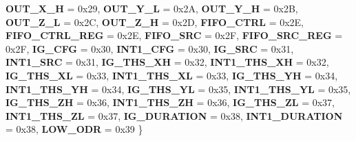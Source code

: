 \begin{DoxyCompactItemize}
{\bfseries O\+U\+T\+\_\+\+X\+\_\+H} = 0x29, 
{\bfseries O\+U\+T\+\_\+\+Y\+\_\+L} = 0x2A, 
{\bfseries O\+U\+T\+\_\+\+Y\+\_\+H} = 0x2B, 
{\bfseries O\+U\+T\+\_\+\+Z\+\_\+L} = 0x2C, 
\newline
{\bfseries O\+U\+T\+\_\+\+Z\+\_\+H} = 0x2D, 
{\bfseries F\+I\+F\+O\+\_\+\+C\+T\+RL} = 0x2E, 
{\bfseries F\+I\+F\+O\+\_\+\+C\+T\+R\+L\+\_\+\+R\+EG} = 0x2E, 
{\bfseries F\+I\+F\+O\+\_\+\+S\+RC} = 0x2F, 
\newline
{\bfseries F\+I\+F\+O\+\_\+\+S\+R\+C\+\_\+\+R\+EG} = 0x2F, 
{\bfseries I\+G\+\_\+\+C\+FG} = 0x30, 
{\bfseries I\+N\+T1\+\_\+\+C\+FG} = 0x30, 
{\bfseries I\+G\+\_\+\+S\+RC} = 0x31, 
\newline
{\bfseries I\+N\+T1\+\_\+\+S\+RC} = 0x31, 
{\bfseries I\+G\+\_\+\+T\+H\+S\+\_\+\+XH} = 0x32, 
{\bfseries I\+N\+T1\+\_\+\+T\+H\+S\+\_\+\+XH} = 0x32, 
{\bfseries I\+G\+\_\+\+T\+H\+S\+\_\+\+XL} = 0x33, 
\newline
{\bfseries I\+N\+T1\+\_\+\+T\+H\+S\+\_\+\+XL} = 0x33, 
{\bfseries I\+G\+\_\+\+T\+H\+S\+\_\+\+YH} = 0x34, 
{\bfseries I\+N\+T1\+\_\+\+T\+H\+S\+\_\+\+YH} = 0x34, 
{\bfseries I\+G\+\_\+\+T\+H\+S\+\_\+\+YL} = 0x35, 
\newline
{\bfseries I\+N\+T1\+\_\+\+T\+H\+S\+\_\+\+YL} = 0x35, 
{\bfseries I\+G\+\_\+\+T\+H\+S\+\_\+\+ZH} = 0x36, 
{\bfseries I\+N\+T1\+\_\+\+T\+H\+S\+\_\+\+ZH} = 0x36, 
{\bfseries I\+G\+\_\+\+T\+H\+S\+\_\+\+ZL} = 0x37, 
\newline
{\bfseries I\+N\+T1\+\_\+\+T\+H\+S\+\_\+\+ZL} = 0x37, 
{\bfseries I\+G\+\_\+\+D\+U\+R\+A\+T\+I\+ON} = 0x38, 
{\bfseries I\+N\+T1\+\_\+\+D\+U\+R\+A\+T\+I\+ON} = 0x38, 
{\bfseries L\+O\+W\+\_\+\+O\+DR} = 0x39
 \}
\end{DoxyCompactItemize}
